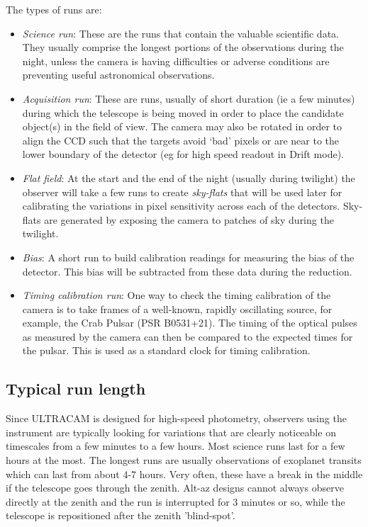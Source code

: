 The types of runs are: 
\begin{itemize}
	\item \emph{Science run}: These are the runs that contain the valuable scientific data. They usually comprise the longest portions of the observations during the night, unless the camera is having difficulties or adverse conditions are preventing useful astronomical observations.
	\item \emph{Acquisition run}: These are runs, usually of short duration (ie a few minutes) during which the telescope is being moved in order to place the candidate object(s) in the field of view. The camera may also be rotated in order to align the CCD such that the targets avoid `bad' pixels or are near to the lower boundary of the detector (eg for high speed readout in Drift mode). 
	\item \emph{Flat field}: At the start and the end of the night (usually during twilight) the observer will take a few runs to create \emph{sky-flats} that will be used later for calibrating the variations in pixel sensitivity across each of the detectors.  Sky-flats are generated by exposing the camera to patches of sky during the twilight. 
	\item \emph{Bias}: A short run to build calibration readings for measuring the bias of the detector. This bias will be subtracted from these data during the reduction. 
	\item \emph{Timing calibration run}: One way to check the timing calibration of the camera is to take frames of a well-known, rapidly oscillating source, for example, the Crab Pulsar (PSR B0531+21). The timing of the optical pulses as measured by the camera can then be compared to the expected times for the pulsar. This is used as a standard clock for timing calibration.
\end{itemize}

\subsection{Typical run length}
Since ULTRACAM is designed for high-speed photometry, observers using the instrument are typically looking for variations that are clearly noticeable on timescales from a few minutes to a few hours. Most science runs last for a few hours at the most. The longest runs are usually observations of exoplanet transits which can last from about 4-7 hours. Very often, these have a break in the middle if the telescope goes through the zenith. Alt-az designs cannot always observe directly at the zenith and the run is interrupted for 3 minutes or so, while the telescope is repositioned after the zenith 'blind-spot'.

